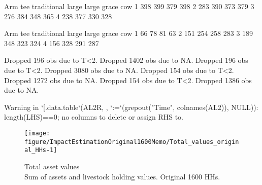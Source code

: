 \begin{Schunk}
\begin{Soutput}
   Arm
tee traditional large large grace cow
  1         398   399         379 398
  2         283   390         373 379
  3         276   384         348 365
  4         238   377         330 328
\end{Soutput}
\begin{Soutput}
   Arm
tee traditional large large grace cow
  1          66    78          81  63
  2         151   254         258 283
  3         189   348         323 324
  4         156   328         291 287
\end{Soutput}
\begin{Soutput}
Dropped 196 obs due to T<2.
Dropped 1402 obs due to NA.
Dropped 196 obs due to T<2.
Dropped 3080 obs due to NA.
Dropped 154 obs due to T<2.
Dropped 1272 obs due to NA.
Dropped 154 obs due to T<2.
Dropped 1386 obs due to NA.
\end{Soutput}
\end{Schunk}

\begin{Schunk}
\begin{Soutput}
Warning in `[.data.table`(AL2R, , `:=`(grepout("Time", colnames(AL2)), NULL)): length(LHS)==0; no columns to delete or assign RHS to.
\end{Soutput}
\end{Schunk}





\begin{Schunk}
\begin{figure}

{\centering \texttt{[image: figure/ImpactEstimationOriginal1600Memo/Total\_values\_original\_HHs-1]} 

}

\caption{Total asset values\\ {\footnotesize Sum of assets and livestock holding values. Original 1600 HHs.\setlength{\baselineskip}{8pt}}}\label{Figure Total values original HHs}
\end{figure}
\end{Schunk}


